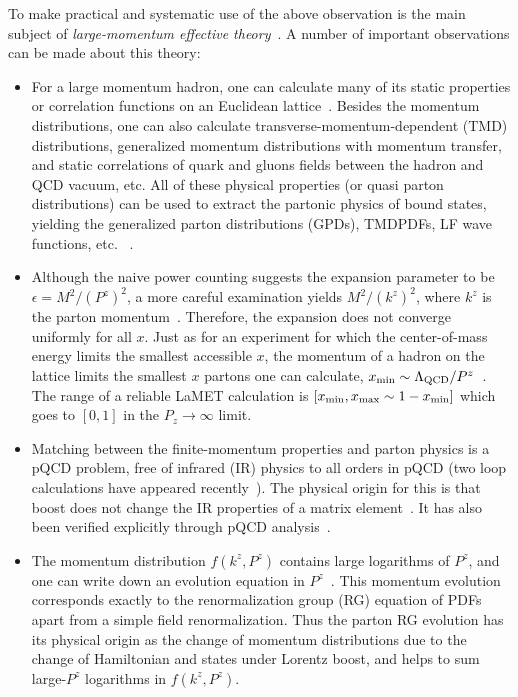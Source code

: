 \documentclass[prd,aps,twocolumn,preprintnumbers,showpacs,nofootinbib,superscriptaddress,notitlepage]{revtex4-1}
\begin{document}
To make practical and systematic use of the above observation
is the main subject of {\it large-momentum effective theory}~\cite{Ji:2014gla}.
A number of important observations can be made
about this theory:

\begin{itemize}
\item{For a large momentum hadron, one can calculate
many of its static properties or correlation functions on an Euclidean lattice~\cite{Ji:2013dva}.
Besides the momentum distributions, one can also calculate transverse-momentum-dependent (TMD) distributions,
generalized momentum distributions with momentum transfer,
and static correlations of quark and gluons fields between the hadron and QCD vacuum,
etc. All of these physical properties (or quasi parton distributions)
can be used to extract the partonic physics of bound states, yielding
the generalized parton distributions (GPDs), TMDPDFs, LF wave functions, etc. ~\cite{Ji:2020ect}.}

\item{Although the naive power counting suggests the expansion
parameter to be $\epsilon=M^2/(P^z)^2$, a more careful examination
yields $M^2/(k^z)^2$, where $k^z$ is the parton momentum~\cite{Ji:2014gla,Ma:2014jla,Izubuchi:2018srq}.
Therefore, the expansion does not converge uniformly for all $x$.
Just as for an experiment for which the center-of-mass energy limits
the smallest accessible $x$, the momentum of a hadron on the lattice
limits the smallest $x$ partons one can calculate, $x_{\rm min}\sim \Lambda_{\rm QCD}/P^z$~\cite{Ji:2013dva}.
The range of a reliable LaMET calculation is $[x_{\rm min}, x_{\rm max}\sim 1-x_{\rm min}]$ which
goes to $[0,1]$ in the $P_z\to\infty$ limit.}

\item{Matching between the finite-momentum properties and parton physics
is a pQCD problem, free of infrared (IR) physics to all orders in pQCD (two
loop calculations have appeared recently~\cite{Chen:2020ody,Li:2020xml}).
The physical origin for this is that boost does not change the IR properties of a
matrix element~\cite{Ji:2014gla}. It has also been verified explicitly through pQCD analysis~\cite{Ma:2014jla}.}

\item{The momentum distribution $f(k^z,P^z)$ contains
large logarithms of $P^z$, and one can write down
an evolution equation in $P^z$~\cite{Ji:2014gla}. This momentum evolution corresponds exactly to
the renormalization group (RG) equation of PDFs apart from a simple
field renormalization. Thus the parton RG evolution has its physical
origin as the change of momentum distributions due to the change
of Hamiltonian and states under Lorentz boost, and helps to
sum large-$P^z$ logarithms in $f(k^z,P^z)$.}


\end{itemize}
\end{document}
